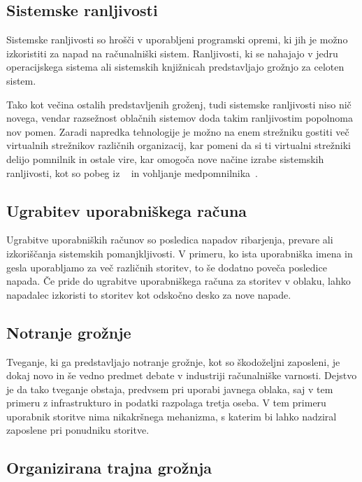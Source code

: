 \documentclass[12pt,a4paper,openany,tikz]{book}
\theoremstyle{plain}
\theoremstyle{definition}
\begin{document}
\subsection{Sistemske ranljivosti}
\label{sub:Sistemske ranljivosti}

Sistemske ranljivosti so hrošči v uporabljeni programski opremi, ki jih je možno izkoristiti za napad na računalniški sistem. Ranljivosti, ki se nahajajo v jedru operacijskega sistema ali sistemskih knjižnicah predstavljajo grožnjo za celoten sistem.

Tako kot večina ostalih predstavljenih groženj, tudi sistemske ranljivosti niso nič novega, vendar razsežnost oblačnih sistemov doda takim ranljivostim popolnoma nov pomen. Zaradi napredka tehnologije je možno na enem strežniku gostiti več virtualnih strežnikov različnih organizacij, kar pomeni da si ti virtualni strežniki delijo pomnilnik in ostale vire, kar omogoča nove načine izrabe sistemskih ranljivosti, kot so pobeg iz ~\cite{schwartz2012new} in vohljanje medpomnilnika~\cite{zhang2012cross}.

\subsection{Ugrabitev uporabniškega računa}
\label{sub:Ugrabitev uporabniškega računa}

Ugrabitve uporabniških računov so posledica napadov ribarjenja, prevare ali izkoriščanja sistemskih pomanjkljivosti. V primeru, ko ista uporabniška imena in gesla uporabljamo za več različnih storitev, to še dodatno poveča posledice napada. Če pride do ugrabitve uporabniškega računa za storitev v oblaku, lahko napadalec izkoristi to storitev kot odskočno desko za nove napade.

\subsection{Notranje grožnje}
\label{sub:Notranje grožnje}

Tveganje, ki ga predstavljajo notranje grožnje, kot so škodoželjni zaposleni, je dokaj novo in še vedno predmet debate v industriji računalniške varnosti. Dejstvo je da tako tveganje obstaja, predvsem pri uporabi javnega oblaka, saj v tem primeru z infrastrukturo in podatki razpolaga tretja oseba. V tem primeru uporabnik storitve nima nikakršnega mehanizma, s katerim bi lahko nadziral zaposlene pri ponudniku storitve.

\subsection{Organizirana trajna grožnja}
\label{sub:Organizirana trajna grožnja}
\end{document}
